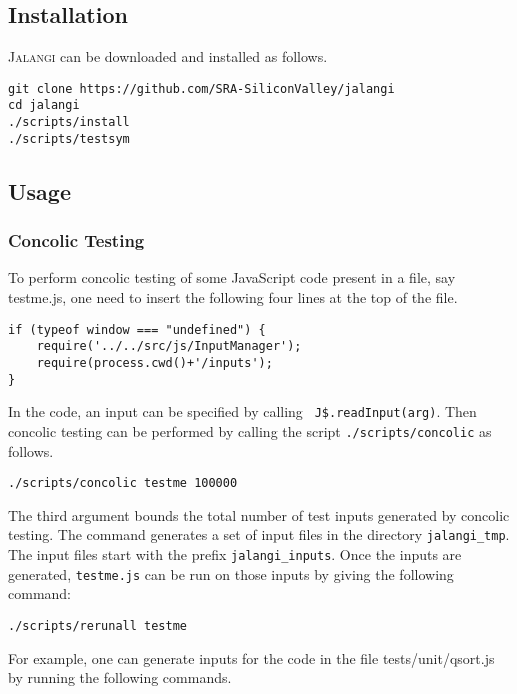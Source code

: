 \documentclass{sig-alternate}
\def\jalangi{\textsc{Jalangi}}
\begin{document}
\subsection{Installation}
\label{sec:installation}

\jalangi{} can be downloaded and installed as follows.

\begin{verbatim}
git clone https://github.com/SRA-SiliconValley/jalangi
cd jalangi
./scripts/install
./scripts/testsym
\end{verbatim}

\subsection{Usage}
\label{sec:usage-1}

\subsubsection*{Concolic Testing}
\label{sec:concolic-testing}

To perform concolic testing of some JavaScript code present in a file,
say testme.js, one need to insert the following four lines at the top
of the file.

\begin{verbatim}
if (typeof window === "undefined") {
    require('../../src/js/InputManager');
    require(process.cwd()+'/inputs');
}
\end{verbatim}

In the code, an input can be specified by calling \texttt{
  J\$.readInput(arg)}. Then concolic testing can be performed by
calling the script \texttt{./scripts/concolic} as follows.

\begin{verbatim}
./scripts/concolic testme 100000
\end{verbatim}

The third argument bounds the total number of test inputs generated by
concolic testing. The command generates a set of input files in the
directory \texttt{jalangi\_tmp}. The input files start with the prefix
\texttt{jalangi\_inputs}.  Once the inputs are generated,
\texttt{testme.js} can be run on those inputs by giving the following
command:

\begin{verbatim}
./scripts/rerunall testme
\end{verbatim}

For example, one can generate inputs for the code in the file
tests/unit/qsort.js by running the following commands.
\end{document}
